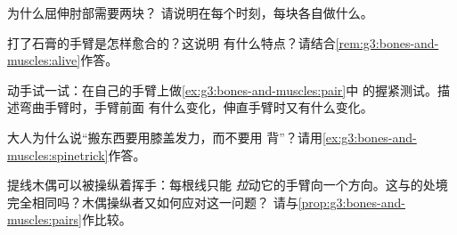 \begin{exercise}[$\star$]\label{exo:g3:bones-and-muscles:6}
为什么屈伸肘部需要两块？
请说明在每个时刻，每块各自做什么。
\end{exercise}

\begin{exercise}[$\star$]\label{exo:g3:bones-and-muscles:7}
打了石膏的手臂是怎样愈合的？这说明
有什么特点？请结合\cref{rem:g3:bones-and-muscles:alive}作答。
\end{exercise}

\begin{exercise}[$\star$]\label{exo:g3:bones-and-muscles:8}
动手试一试：在自己的手臂上做\cref{ex:g3:bones-and-muscles:pair}中
的握紧测试。描述弯曲手臂时，手臂前面
有什么变化，伸直手臂时又有什么变化。
\end{exercise}

\begin{exercise}[$\star\star$]\label{exo:g3:bones-and-muscles:9}
大人为什么说“搬东西要用膝盖发力，而不要用
背”？请用\cref{ex:g3:bones-and-muscles:spinetrick}作答。
\end{exercise}

\begin{exercise}[$\star\star$]\label{exo:g3:bones-and-muscles:10}
提线木偶可以被操纵着挥手：每根线只能
\emph{拉}动它的手臂向一个方向。这与的处境
完全相同吗？木偶操纵者又如何应对这一问题？
请与\cref{prop:g3:bones-and-muscles:pairs}作比较。
\end{exercise}
